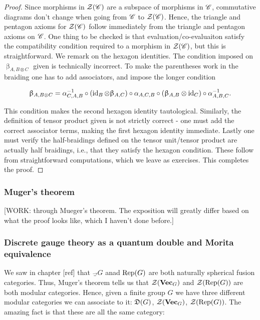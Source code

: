 \begin{proof} Since morphisms in $\mathcal{Z}(\mathscr{C})$ are a subspace of morphisms in $\mathscr{C}$, commutative diagrams don't change when going from $\mathscr{C}$ to $\mathcal{Z}(\mathscr{C})$. Hence, the triangle and pentagon axioms for $\mathcal{Z}(\mathscr{C})$ follow immediately from the triangle and pentagon axioms on $\mathscr{C}$. One thing to be checked is that evaluation/co-evaluaiton satisfy the compatibility condition required to a morphism in $\mathcal{Z}(\mathscr{C})$, but this is straightforward. We remark on the hexagon identities. The condition imposed on $\upbeta_{A,B\otimes C}$ given is technically incorrect. To make the parentheses work in the braiding one has to add associators, and impose the longer condition

$$\upbeta_{A,B\otimes C}=\alpha_{C,A,B}^{-1}\circ \left(\operatorname{id}_{B}\otimes \upbeta_{A,C}\right)\circ \alpha_{A,C,B}\circ\left(\upbeta_{A,B}\otimes \operatorname{id}_C\right)\circ \alpha^{-1}_{A,B,C}.$$

This condition makes the second hexagon identity tautological. Similarly, the definition of tensor product given is not strictly correct - one must add the correct associator terms, making the first hexagon identity immediate. Lastly one must verify the half-braidings defined on the tensor unit/tensor product are actually half braidings, i.e., that they satisfy the hexagon condition. These follow from straightforward computations, which we leave as exercises. This completes the proof.

\end{proof}

\subsubsection{Muger's theorem}

[WORK: through Mueger's theorem. The exposition will greatly differ based on what the proof looks like, which I haven't done before.]

\subsubsection{Discrete gauge theory as a quantum double and Morita equivalence}

We saw in chapter [ref] that $\Vec_G$ anad $\operatorname{Rep}(G)$ are both naturally spherical fusion categories. Thus, Muger's theorem tells us that $\mathcal{Z}(\mathbf{Vec}_G)$ and $\mathcal{Z}(\operatorname{Rep}(G))$ are both modular categories. Hence, given a finite group $G$ we have three different modular categories we can associate to it: $\mathfrak{D}(G)$, $\mathcal{Z}(\mathbf{Vec}_G)$, $\mathcal{Z}(\operatorname{Rep}(G))$. The amazing fact is that these are all the same category:

